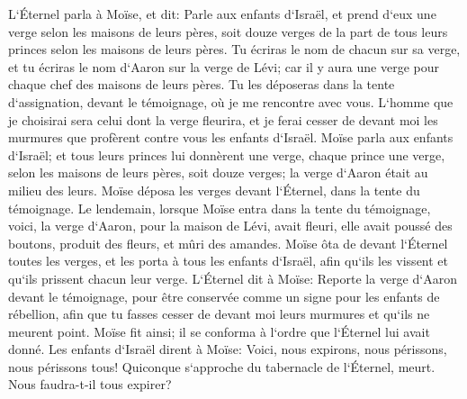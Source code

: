 \verse L`Éternel parla à Moïse, et dit: 
\verse Parle aux enfants d`Israël, et prend d`eux une verge selon les maisons de leurs pères, soit douze verges de la part de tous leurs princes selon les maisons de leurs pères. 
\verse Tu écriras le nom de chacun sur sa verge, et tu écriras le nom d`Aaron sur la verge de Lévi; car il y aura une verge pour chaque chef des maisons de leurs pères. 
\verse Tu les déposeras dans la tente d`assignation, devant le témoignage, où je me rencontre avec vous. 
\verse L`homme que je choisirai sera celui dont la verge fleurira, et je ferai cesser de devant moi les murmures que profèrent contre vous les enfants d`Israël. 
\verse Moïse parla aux enfants d`Israël; et tous leurs princes lui donnèrent une verge, chaque prince une verge, selon les maisons de leurs pères, soit douze verges; la verge d`Aaron était au milieu des leurs. 
\verse Moïse déposa les verges devant l`Éternel, dans la tente du témoignage. 
\verse Le lendemain, lorsque Moïse entra dans la tente du témoignage, voici, la verge d`Aaron, pour la maison de Lévi, avait fleuri, elle avait poussé des boutons, produit des fleurs, et mûri des amandes. 
\verse Moïse ôta de devant l`Éternel toutes les verges, et les porta à tous les enfants d`Israël, afin qu`ils les vissent et qu`ils prissent chacun leur verge. 
\verse L`Éternel dit à Moïse: Reporte la verge d`Aaron devant le témoignage, pour être conservée comme un signe pour les enfants de rébellion, afin que tu fasses cesser de devant moi leurs murmures et qu`ils ne meurent point. 
\verse Moïse fit ainsi; il se conforma à l`ordre que l`Éternel lui avait donné. 
\verse Les enfants d`Israël dirent à Moïse: Voici, nous expirons, nous périssons, nous périssons tous! 
\verse Quiconque s`approche du tabernacle de l`Éternel, meurt. Nous faudra-t-il tous expirer? 

